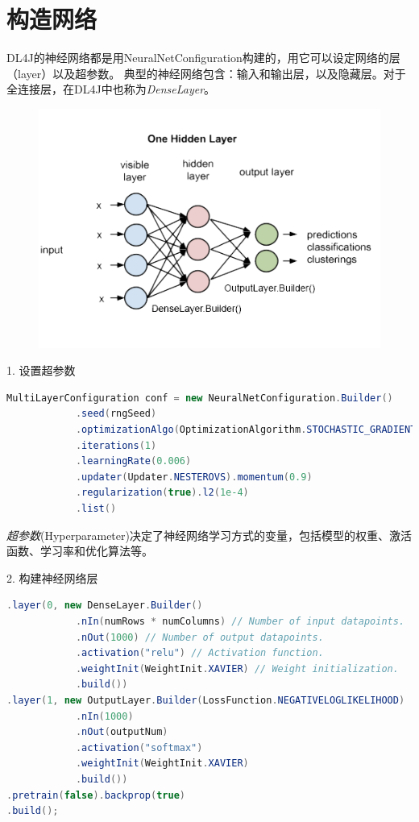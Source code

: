 \section{构造网络}
DL4J的神经网络都是用NeuralNetConfiguration构建的，用它可以设定网络的层（layer）以及超参数。
典型的神经网络包含：输入和输出层，以及隐藏层。对于全连接层，在DL4J中也称为\emph{DenseLayer}。\\

\begin{figure}[!htb]
\centerline{\includegraphics[width=.35\figwidth]{images/onelayer_labeled.png}}
\label{fig:part3_dl4j_onelayer}
\end{figure}


1. 设置超参数
\begin{lstlisting}[language=Java]
MultiLayerConfiguration conf = new NeuralNetConfiguration.Builder()
            .seed(rngSeed)
            .optimizationAlgo(OptimizationAlgorithm.STOCHASTIC_GRADIENT_DESCENT)
            .iterations(1)
            .learningRate(0.006)
            .updater(Updater.NESTEROVS).momentum(0.9)
            .regularization(true).l2(1e-4)
            .list()
\end{lstlisting}
\emph{超参数}(Hyperparameter)决定了神经网络学习方式的变量，包括模型的权重、激活函数、学习率和优化算法等。
\vspace{0.3cm}

2. 构建神经网络层
\begin{lstlisting}[language=Java]
.layer(0, new DenseLayer.Builder()
            .nIn(numRows * numColumns) // Number of input datapoints.
            .nOut(1000) // Number of output datapoints.
            .activation("relu") // Activation function.
            .weightInit(WeightInit.XAVIER) // Weight initialization.
            .build())
.layer(1, new OutputLayer.Builder(LossFunction.NEGATIVELOGLIKELIHOOD)
            .nIn(1000)
            .nOut(outputNum)
            .activation("softmax")
            .weightInit(WeightInit.XAVIER)
            .build())
.pretrain(false).backprop(true)
.build();
\end{lstlisting}

